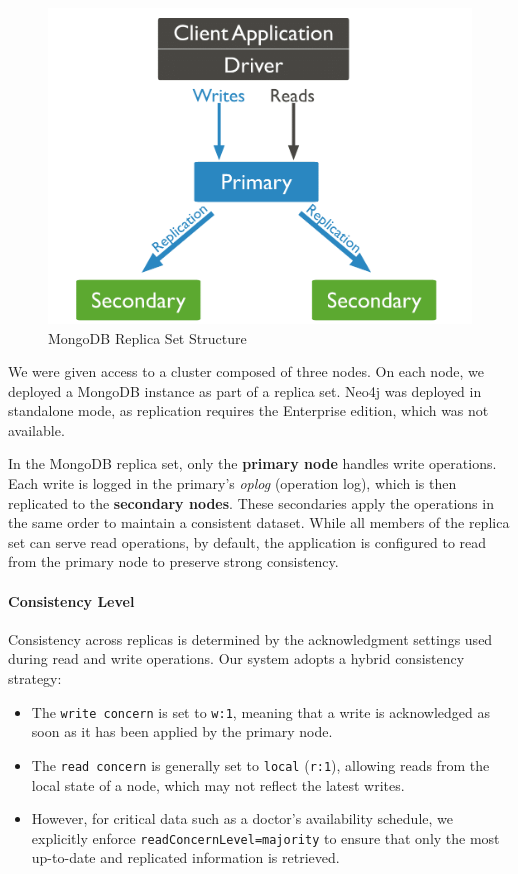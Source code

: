 \begin{figure}[t]
    \centering
    \includegraphics[scale=0.2]{./resources/mongo_replica.png}
    \caption{MongoDB Replica Set Structure}
    \label{fig:mongo-replica}
\end{figure}

We were given access to a cluster composed of three nodes. On each node, we deployed a MongoDB instance as part of a replica set. Neo4j was deployed in standalone mode, as replication requires the Enterprise edition, which was not available.

In the MongoDB replica set, only the \textbf{primary node} handles write operations. Each write is logged in the primary’s \emph{oplog} (operation log), which is then replicated to the \textbf{secondary nodes}. These secondaries apply the operations in the same order to maintain a consistent dataset. While all members of the replica set can serve read operations, by default, the application is configured to read from the primary node to preserve strong consistency.

\paragraph{Consistency Level}

Consistency across replicas is determined by the acknowledgment settings used during read and write operations. Our system adopts a hybrid consistency strategy:

\begin{itemize}
  \item The \texttt{write concern} is set to \texttt{w:1}, meaning that a write is acknowledged as soon as it has been applied by the primary node.
  \item The \texttt{read concern} is generally set to \texttt{local} (\texttt{r:1}), allowing reads from the local state of a node, which may not reflect the latest writes.
  \item However, for critical data such as a doctor's availability schedule, we explicitly enforce \texttt{readConcernLevel=majority} to ensure that only the most up-to-date and replicated information is retrieved.
\end{itemize}

